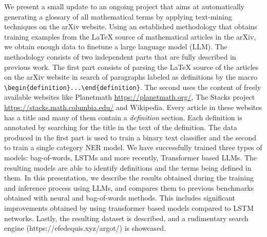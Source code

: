 We present a small update to an ongoing project that aims at automatically generating a glossary of all mathematical terms by applying text-mining techniques on the arXiv website. Using an established methodology that obtains training examples from the \LaTeX{} source of mathematical articles in the arXiv, we obtain enough data to finetune a large language model (LLM). 
The methodology consists of two independent parts that are fully described in previous work. The first part consists of parsing the \LaTeX{} source of the articles on the arXiv website in search of paragraphs labeled as definitions by the macro \verb|\begin{definition}...\end{definition}|. The second uses the content of freely available websites like Planetmath \url{https://planetmath.org/}, The Stacks project \url{https://stacks.math.columbia.edu/} and Wikipedia. Every article in these websites has a title and many of them contain a \emph{definition} section. Each definition is annotated by searching for the title in the text of the definition. 
The data produced in the first part is used to train a binary text classifier and the second to train a single category NER model. We have successfully trained three types of models: bag-of-words, LSTMs and more recently, Transformer based LLMs. 
The resulting models are able to identify definitions and the terms being defined in them. In this presentation, we describe the results obtained during the training and inference process using LLMs, and compares them to previous benchmarks obtained with neural and bag-of-words methods. This includes significant improvements obtained by using transformer based models compared to LSTM networks. Lastly, the resulting dataset is described, and a rudimentary search engine (https://efedequis.xyz/argot/) is showcased. 

